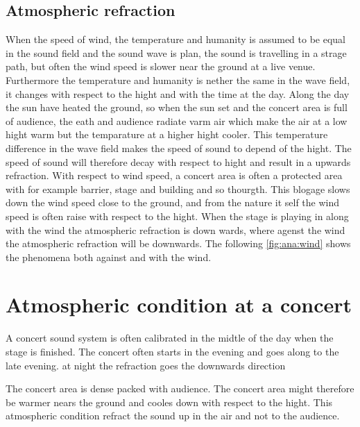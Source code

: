  \subsection{Atmospheric refraction}
 When the speed of wind,  the temperature and humanity is assumed to be equal in the sound field and the sound wave is plan, the sound is travelling in a strage path, but often the wind speed is slower near the ground at a live venue. Furthermore the temperature and humanity is nether the same in the wave field, it changes with respect to the hight and with the time at the day.  Along the day the sun have heated the ground, so when the sun set and the concert area is full of audience, the eath and audience radiate varm air which make the air at a low hight warm but the temparature at a higher hight cooler. This temperature difference in the wave field makes the speed of sound to depend of the hight. The speed of sound will therefore decay with respect to hight and result in a upwards refraction. With respect to wind speed, a concert area is often a protected area with for example barrier, stage and building and so thourgth. This blogage slows down the wind speed close to the ground, and from the nature it self the wind speed is often raise with respect to the hight. When the stage is playing in along with the wind the atmospheric refraction is down wards, where agenst the wind the atmospheric refraction will be downwards. The following \autoref{fig:ana:wind} shows the phenomena both against and with the wind.





 \section{Atmospheric condition at a concert}
A concert sound system is often calibrated in the midtle of the day when the stage is finished. The concert often starts in the evening and goes along to the late evening. at night the refraction goes the downwards direction 

The concert area is dense packed with audience. The concert area might therefore be warmer nears the ground and cooles down with respect to the hight. This atmospheric condition refract the sound up in the air and not to the audience. 




